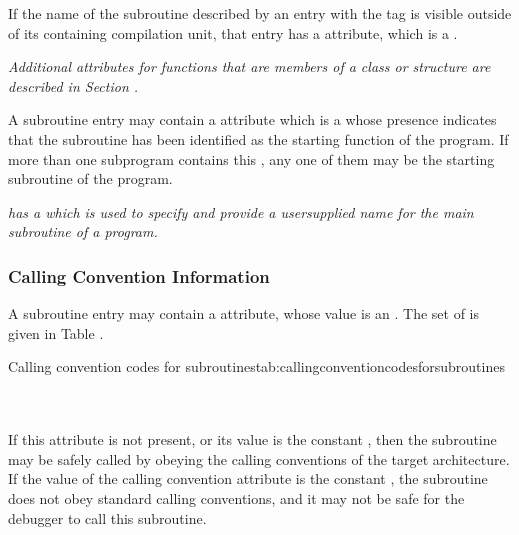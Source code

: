 If the name of the subroutine described by an entry with the
tag \DWTAGsubprogram{}
is visible outside of its containing
\hypertarget{chap:DWATexternalexternalsubroutine}{}
compilation unit, that entry has 
a 
\DWATexternalNAME{} attribute,
which is a .

\textit{Additional attributes for functions that are members of a
class or structure are described in 
Section .
}

A 
\hypertarget{chap:DWATmainsubprogrammainorstartingsubprogram}{}
subroutine entry 
may contain a 
\DWATmainsubprogramNAME{}
attribute 
which is 
a \CLASSflag{} whose presence indicates that the
subroutine has been identified as the starting function of
the program.  If more than one subprogram contains this 
,
any one of them may be the starting subroutine of the program.

\textit{ has a  
which is used to specify
and provide a user\dash supplied name for the main subroutine of
a program.
}

\subsubsection{Calling Convention Information}
A subroutine entry may 
\hypertarget{chap:DWATcallingconventionforsubprograms}{}
contain a 
\DWATcallingconventionNAME{}
attribute, whose value is an 
. The set of
is given in Table .

\begin{simplenametable}[1.4in]{Calling convention codes for subroutines}{tab:callingconventioncodesforsubroutines}
\DWCCnormal        \\
\DWCCprogram       \\
\DWCCnocall        \\
\end{simplenametable}

If this attribute is not present, or its value is the constant
\DWCCnormalTARG, then the subroutine may be safely called by
obeying the  calling conventions of the target
architecture. If the value of the calling convention attribute
is the constant \DWCCnocallTARG, the subroutine does not obey
standard calling conventions, and it may not be safe for the
debugger to call this subroutine.

